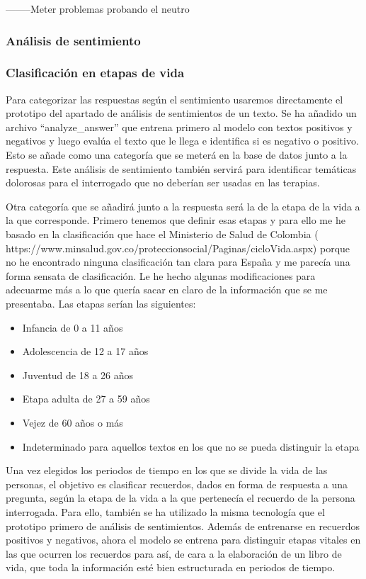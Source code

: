 --------Meter problemas probando el neutro

\subsubsection{Análisis de sentimiento}

\subsubsection{Clasificación en etapas de vida}

Para categorizar las respuestas según el sentimiento usaremos directamente el prototipo del apartado de análisis de sentimientos de un texto. Se ha añadido un archivo ``analyze\_answer'' que entrena primero al modelo con textos positivos y negativos y luego evalúa el texto que le llega e identifica si es negativo o positivo. Esto se añade como una categoría que se meterá en la base de datos junto a la respuesta. Este análisis de sentimiento también servirá para identificar temáticas dolorosas para el interrogado que no deberían ser usadas en las terapias. 

Otra categoría que se añadirá junto a la respuesta será la de la etapa de la vida a la que corresponde. Primero tenemos que definir esas etapas y para ello me he basado en la clasificación que hace el Ministerio de Salud de Colombia ( https://www.minsalud.gov.co/proteccionsocial/Paginas/cicloVida.aspx) porque no he encontrado ninguna clasificación tan clara para España y me parecía una forma sensata de clasificación. Le he hecho algunas modificaciones para adecuarme más a lo que quería sacar en claro de la información que se me presentaba. Las etapas serían las siguientes:
\begin{itemize}
	\item Infancia de 0 a 11 años
	\item Adolescencia de 12 a 17 años
	\item Juventud de 18 a 26 años
	\item Etapa adulta de 27 a 59 años
	\item Vejez de 60 años o más
	\item Indeterminado para aquellos textos en los que no se pueda distinguir la etapa
\end{itemize}

Una vez elegidos los periodos de tiempo en los que se divide la vida de las personas, el objetivo es clasificar recuerdos, dados en forma de respuesta a una pregunta, según la etapa de la vida a la que pertenecía el recuerdo de la persona interrogada. Para ello, también se ha utilizado la misma tecnología que el prototipo primero de análisis de sentimientos. Además de entrenarse en recuerdos positivos y negativos, ahora el modelo se entrena para distinguir etapas vitales en las que ocurren los recuerdos para así, de cara a la elaboración de un libro de vida, que toda la información esté bien estructurada en periodos de tiempo. 


